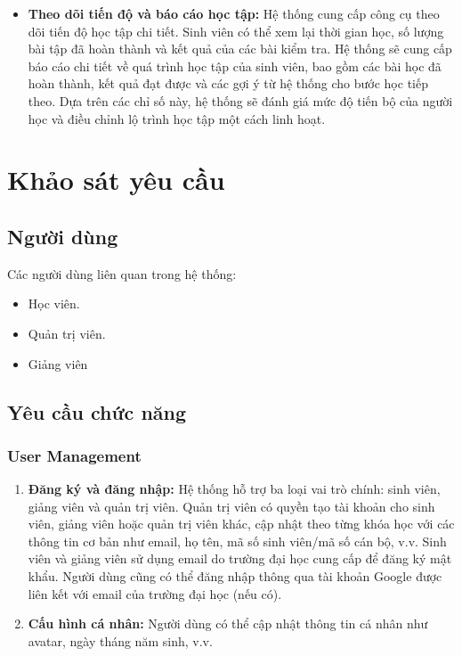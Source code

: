 \begin{itemize}
    \item \textbf{Theo dõi tiến độ và báo cáo học tập:} Hệ thống cung cấp công cụ theo dõi tiến độ học tập chi tiết. Sinh viên có thể xem lại thời gian học, số lượng bài tập đã hoàn thành và kết quả của các bài kiểm tra. Hệ thống sẽ cung cấp báo cáo chi tiết về quá trình học tập của sinh viên, bao gồm các bài học đã hoàn thành, kết quả đạt được và các gợi ý từ hệ thống cho bước học tiếp theo. Dựa trên các chỉ số này, hệ thống sẽ đánh giá mức độ tiến bộ của người học và điều chỉnh lộ trình học tập một cách linh hoạt.
\end{itemize}

\section{Khảo sát yêu cầu}
\subsection{Người dùng}
Các người dùng liên quan trong hệ thống:  
\begin{itemize}
    \item Học viên.
    \item Quản trị viên.
    \item Giảng viên
\end{itemize}
\subsection{Yêu cầu chức năng}
\subsubsection{User Management}
\begin{enumerate}
    \item \textbf{Đăng ký và đăng nhập:} Hệ thống hỗ trợ ba loại vai trò chính: sinh viên, giảng viên và quản trị viên. Quản trị viên có quyền tạo tài khoản cho sinh viên, giảng viên hoặc quản trị viên khác, cập nhật theo từng khóa học với các thông tin cơ bản như email, họ tên, mã số sinh viên/mã số cán bộ, v.v. Sinh viên và giảng viên sử dụng email do trường đại học cung cấp để đăng ký mật khẩu. Người dùng cũng có thể đăng nhập thông qua tài khoản Google được liên kết với email của trường đại học (nếu có).
    \item \textbf{Cấu hình cá nhân:} Người dùng có thể cập nhật thông tin cá nhân như avatar, ngày tháng năm sinh, v.v.
\end{enumerate}
